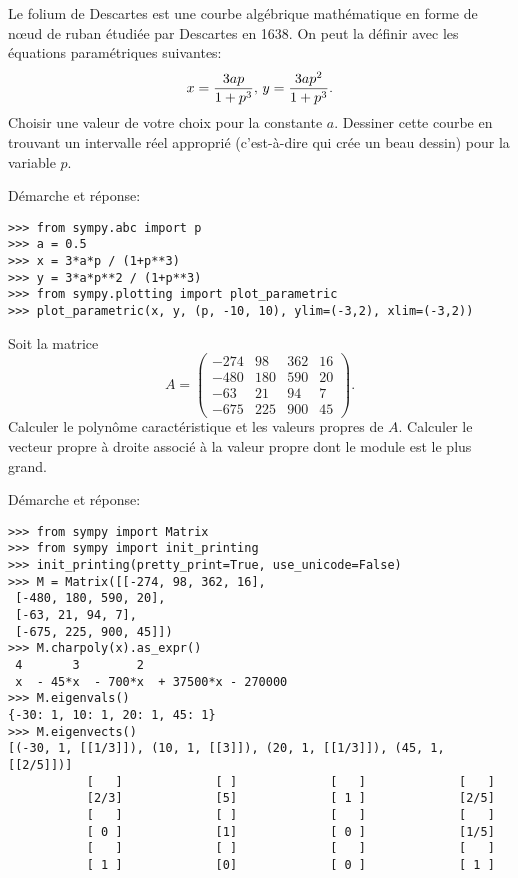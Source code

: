 \begin{question}[2 pts]
Le folium de Descartes est une courbe algébrique mathématique en forme de nœud
de ruban étudiée par Descartes en 1638. On peut la définir avec les équations
paramétriques suivantes:
\[
{\displaystyle x={{3ap} \over
{1+p^{3}}},\,y={{3ap^{2}} \over {1+p^{3}}}}.
\]
Choisir une valeur de votre choix pour la constante $a$. Dessiner cette courbe
en trouvant un intervalle réel approprié (c'est-à-dire qui crée un beau
dessin) pour la variable $p$.
\begin{mybox}
    Démarche et réponse:
\begin{reponse}
\begin{verbatim}
>>> from sympy.abc import p
>>> a = 0.5
>>> x = 3*a*p / (1+p**3)
>>> y = 3*a*p**2 / (1+p**3)
>>> from sympy.plotting import plot_parametric
>>> plot_parametric(x, y, (p, -10, 10), ylim=(-3,2), xlim=(-3,2))
\end{verbatim}
\end{reponse}
\end{mybox}
\end{question}


\begin{question}[2 pts]
    Soit la matrice
    \[
	A = \left(\begin{array}{rrrr}
	-274 & 98 & 362 & 16 \\
	-480 & 180 & 590 & 20 \\
	-63 & 21 & 94 & 7 \\
	-675 & 225 & 900 & 45
	\end{array}\right).
    \]
    Calculer le polynôme caractéristique et les valeurs propres de $A$.
    Calculer le vecteur propre à droite associé à la valeur propre dont le
    module est le plus grand.
\begin{mybox}
Démarche et réponse:
\begin{reponse}
\begin{verbatim}
>>> from sympy import Matrix
>>> from sympy import init_printing
>>> init_printing(pretty_print=True, use_unicode=False)
>>> M = Matrix([[-274, 98, 362, 16],
 [-480, 180, 590, 20],
 [-63, 21, 94, 7],
 [-675, 225, 900, 45]])
>>> M.charpoly(x).as_expr()
 4       3        2
 x  - 45*x  - 700*x  + 37500*x - 270000
>>> M.eigenvals()
{-30: 1, 10: 1, 20: 1, 45: 1}
>>> M.eigenvects()
[(-30, 1, [[1/3]]), (10, 1, [[3]]), (20, 1, [[1/3]]), (45, 1, [[2/5]])]
           [   ]             [ ]             [   ]             [   ]
           [2/3]             [5]             [ 1 ]             [2/5]
           [   ]             [ ]             [   ]             [   ]
           [ 0 ]             [1]             [ 0 ]             [1/5]
           [   ]             [ ]             [   ]             [   ]
           [ 1 ]             [0]             [ 0 ]             [ 1 ]
\end{verbatim}
\end{reponse}
\end{mybox}
\end{question}


